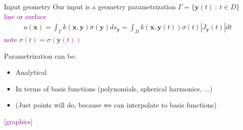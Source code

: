 \documentclass[t]{beamer}
\newcommand{\mbf}[1]{{\bm #1}}           %
\newcommand{\com}[1]{{\scriptsize \textcolor{purple}{#1}}}      %
\newcommand{\vg}{\vspace{2ex}}
\newcommand{\xx}{\mbf{x}}
\newcommand{\yy}{\mbf{y}}
\begin{document}
\begin{frame}{Input geometry}
  Our input is a geometry parametrization
  $\Gamma = \{\yy(t) \::\: t \in D\}$ \com{line or surface}
  \begin{align}
    u(\xx) = 
    \int_\Gamma k(\xx, \yy) \sigma(\yy) ds_\yy
    =
    \int_D k(\xx, \yy(t)) \sigma(t) |J_\yy(t)|dt
  \end{align}
  \hfill\com{note $\sigma(t) = \sigma(\yy(t))$}

  \vg
  Parametrization can be:
  \begin{itemize}
  \item Analytical
  \item In terms of basis functions (polynomials, spherical harmonics, ...)
  \item (Just points will do, because we can interpolate to basis functions)
  \end{itemize}
  \begin{center}
    \com{[graphics]}
  \end{center}
\end{frame}
\end{document}
